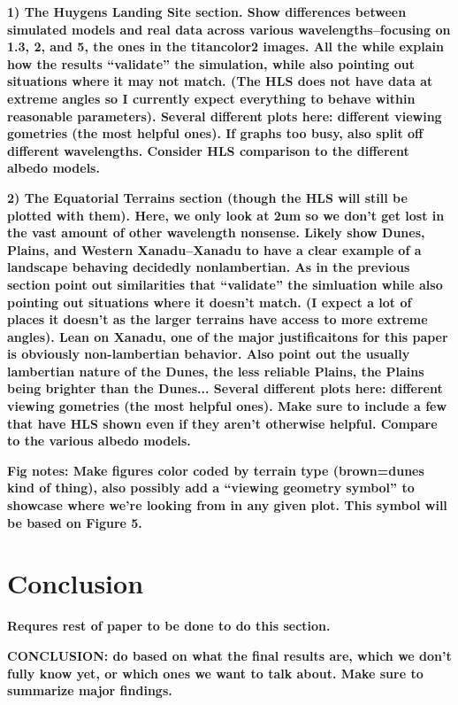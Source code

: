\documentclass[twocolumn,linenumbers]{aastex631}
\begin{document}
\textbf{\color{blue}1) The Huygens Landing Site section. Show differences between simulated models and real data across various wavelengths--focusing on 1.3, 2, and 5, the ones in the titancolor2 images. All the while explain how the results ``validate'' the simulation, while also pointing out situations where it may not match. (The HLS does not have data at extreme angles so I currently expect everything to behave within reasonable parameters). Several different plots here: different viewing gometries (the most helpful ones). If graphs too busy, also split off different wavelengths. Consider HLS comparison to the different albedo models.\color{black}}

\textbf{\color{blue}2) The Equatorial Terrains section (though the HLS will still be plotted with them). Here, we only look at 2um so we don't get lost in the vast amount of other wavelength nonsense. Likely show Dunes, Plains, and Western Xanadu--Xanadu to have a clear example of a landscape behaving decidedly nonlambertian. As in the previous section point out similarities that ``validate'' the simluation while also pointing out situations where it doesn't match. (I expect a lot of places it doesn't as the larger terrains have access to more extreme angles). Lean on Xanadu, one of the major justificaitons for this paper is obviously non-lambertian behavior. Also point out the usually lambertian nature of the Dunes, the less reliable Plains, the Plains being brighter than the Dunes... Several different plots here: different viewing gometries (the most helpful ones). Make sure to include a few that have HLS shown even if they aren't otherwise helpful. Compare to the various albedo models. \color{black}}

\textbf{\color{blue}Fig notes: Make figures color coded by terrain type (brown=dunes kind of thing), also possibly add a ``viewing geometry symbol'' to showcase where we're looking from in any given plot. This symbol will be based on Figure 5.\color{black}}

\section{Conclusion} \label{sec:conclusion}

\textbf{\color{blue}Requres rest of paper to be done to do this section.\color{black}}

\textbf{\color{blue}CONCLUSION: do based on what the final results are, which we don't fully know yet, or which ones we want to talk about. Make sure to summarize major findings. \color{black}}
\end{document}
